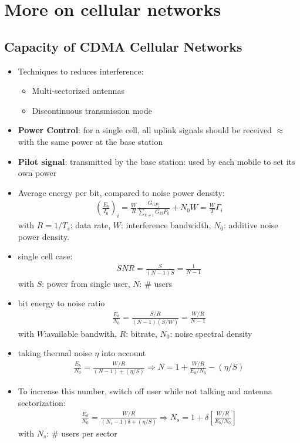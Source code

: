 \section{More on cellular networks}
\subsection{Capacity of CDMA Cellular Networks}
\begin{itemize}
	\item Techniques to reduces interference:
	\begin{itemize}
		\item Multi-sectorized antennas
		\item Discontinuous transmission mode
	\end{itemize}
	\item \textbf{Power Control}: for a single cell, all uplink signals should be received $\approx$ with the same power at the base station
	\item \textbf{Pilot signal}: transmitted by the base station: used by each mobile to set its own power
	\item Average energy per bit, compared to noise power density:
	\begin{align*}
		\left(
		\frac{E_b}{I_0} 
		\right)_i = \frac{W}{R} \frac{G_{ii P_i}}{\sum_{k \neq i} G_{ki} P_k} + N_0 W = \frac{W}{T} \Gamma_i
	\end{align*}
	with $R= 1/ T_s$: data rate, $W$: interference bandwidth, $N_0$: additive noise power density.
	\item single cell case:
	\begin{align*}
		SNR = \frac{S}{(N-1)S} = \frac{1}{N-1}
	\end{align*}
	with $S$: power from single user, $N$: \# users
	\item bit energy to noise ratio
	\begin{align*}
		\frac{E_b}{N_0} = \frac{S/R}{(N-1)(S/W)} = \frac{W/R}{N-1}
	\end{align*}
	with $W$:available bandwith, $R$: bitrate, $N_0$: noise spectral density
	\item taking thermal noise $\eta$ into account
	\begin{align*}
		\frac{E_b}{N_0} = \frac{W/R}{(N-1) + (\eta / S)} \Rightarrow
		N = 1 + \frac{W/R}{E_b/N_0} - (\eta/S)
	\end{align*}
	\item To increase this number, switch off user while not talking and antenna sectorization:
	\begin{align*}
		\frac{E_b}{N_0} = \frac{W/R}{(N_s-1)\delta + (\eta / S)} \Rightarrow N_s = 1 + \delta 
			\left[ 
				\frac{W / R}{E_b / N_0}
			\right]
	\end{align*}
	with $N_s$: \# users per sector
\end{itemize}

